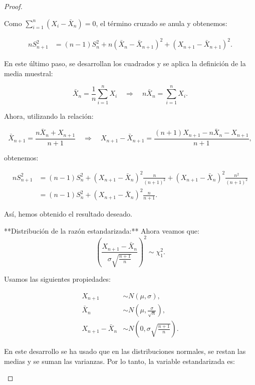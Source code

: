 \begin{proof}
\begin{enumerate}
		      Como $\sum_{i=1}^{n} \left(X_{i} - \bar{X}_{n} \right) = 0$, el término cruzado
		      se anula y obtenemos:

		      \begin{align*}
			      n S_{n+1}^{2} & = (n-1) S_{n}^{2} + n \left(\bar{X}_{n} - \bar{X}_{n+1} \right)^{2} + \left(X_{n+1} - \bar{X}_{n+1} \right)^{2}.
		      \end{align*}

		      En este último paso, se desarrollan los cuadrados y se aplica la definición de
		      la media muestral:

		      $$
			      \bar{X}_{n} = \frac{1}{n} \sum_{i=1}^{n} X_{i} \quad \Longrightarrow \quad n \bar{X}_{n} = \sum_{i=1}^{n} X_{i}.
		      $$

		      Ahora, utilizando la relación:

		      $$
			      \bar{X}_{n+1} = \frac{n \bar{X}_{n} + X_{n+1}}{n+1} \quad \Longrightarrow \quad X_{n+1} - \bar{X}_{n+1} = \frac{(n+1)X_{n+1} - n\bar{X}_{n} - X_{n+1}}{n+1},
		      $$

		      obtenemos:

		      \begin{align*}
			      n S_{n+1}^{2} & = (n-1) S_{n}^{2} + \left(X_{n+1} - \bar{X}_{n} \right)^{2} \frac{n}{(n+1)^2} + \left(X_{n+1} - \bar{X}_{n} \right)^{2} \frac{n^2}{(n+1)^2} \\
			                    & = (n-1) S_{n}^{2} + \left(X_{n+1} - \bar{X}_{n} \right)^{2} \frac{n}{n+1}.
		      \end{align*}

		      Así, hemos obtenido el resultado deseado.

		      **Distribución de la razón estandarizada:**
		      Ahora veamos que:
		      $$
			      \left(\frac{X_{n+1} - \bar{X}_{n}}{\sigma \sqrt{\frac{n+1}{n}}} \right)^2 \sim \chi_1^2.
		      $$

		      Usamos las siguientes propiedades:

		      \begin{align*}
			      X_{n+1}             & \sim N(\mu, \sigma),                                \\
			      \bar{X}_n           & \sim N\left(\mu, \frac{\sigma}{\sqrt{n}}\right),    \\
			      X_{n+1} - \bar{X}_n & \sim N\left(0, \sigma \sqrt{\frac{n+1}{n}} \right).
		      \end{align*}

		      En este desarrollo se ha usado que en las distribuciones normales, se restan
		      las medias y se suman las varianzas. Por lo tanto, la variable estandarizada
		      es:


\end{enumerate}
\end{proof}

